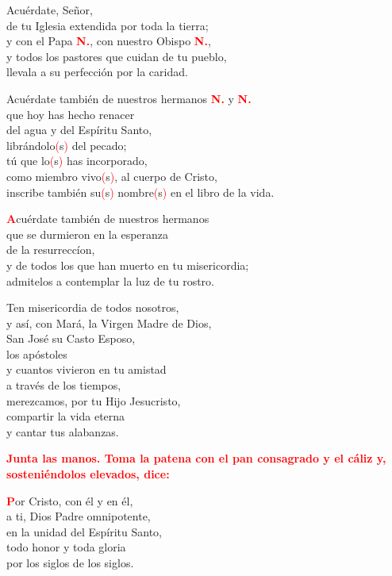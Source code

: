 \documentclass[12pt, letterpaper]{report}
\begin{document}
Acu\'erdate, Se\~nor,\\
de tu Iglesia extendida por toda la tierra; \\
y con el Papa {\bfseries \textcolor{red}{N.}}, con nuestro Obispo {\bfseries \textcolor{red}{N.}},\\
y todos los pastores que cuidan de tu pueblo,\\
llevala a su perfecci\'on por la caridad.

Acu\'erdate tambi\'en de nuestros hermanos {\bfseries \textcolor{red}{N.}} y {\bfseries \textcolor{red}{N.}} \\
que hoy has hecho renacer \\
del agua y del Esp\'iritu Santo, \\
libr\'andolo\textcolor{red}{(}s\textcolor{red}{)} del pecado; \\
t\'u que lo\textcolor{red}{(}s\textcolor{red}{)} has incorporado, \\
como miembro vivo\textcolor{red}{(}s\textcolor{red}{)}, al cuerpo de Cristo, \\
inscribe tambi\'en su\textcolor{red}{(}s\textcolor{red}{)} nombre\textcolor{red}{(}s\textcolor{red}{)} en el libro de la vida.

\lettrine[lines=1]{\bfseries \textcolor{red}{A}}{}\Large cu\'erdate tambi\'en de nuestros hermanos\\
que se durmieron en la esperanza\\
de la resurrecc\'ion,\\
y de todos los que han muerto en tu misericordia;\\
admitelos a contemplar la luz de tu rostro.

Ten misericordia de todos nosotros,\\
y as\'i, con Mar\'a, la Virgen Madre de Dios,\\
San Jos\'e su Casto Esposo, \\
los ap\'ostoles\\
y cuantos vivieron en tu amistad\\
a trav\'es de los tiempos,\\
merezcamos, por tu Hijo Jesucristo,\\
compartir la vida eterna\\
y cantar tus alabanzas. 

\large{\bfseries \textcolor{red}{Junta las manos. Toma la patena con el pan consagrado y el c\'aliz y, sosteni\'endolos elevados, dice:}}

\lettrine[lines=1]{\bfseries \textcolor{red}{P}}{}\Large or Cristo, con \'el y en \'el,\\
a ti, Dios Padre omnipotente,\\
en la unidad del Esp\'iritu Santo,\\
todo honor y toda gloria\\
por los siglos de los siglos.
\end{document}
